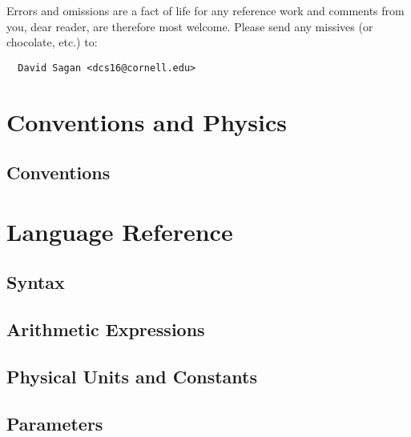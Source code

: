 \documentclass{book}
\begin{document}
Errors and omissions are a fact of life for any reference work and
comments from you, dear reader, are therefore most welcome. Please
send any missives (or chocolate, etc.) to:
\begin{verbatim}
  David Sagan <dcs16@cornell.edu>
\end{verbatim}


\tableofcontents

\listoffigures

\listoftables

\part{Conventions and Physics}

\chapter{Conventions}


\part{Language Reference}


\chapter{Syntax}

\chapter{Arithmetic Expressions}

\chapter{Physical Units and Constants}

\chapter{Parameters}
\end{document}
